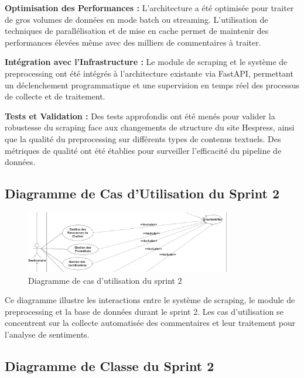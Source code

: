 \textbf{Optimisation des Performances :} L'architecture a été optimisée pour traiter de gros volumes de données en mode batch ou streaming. L'utilisation de techniques de parallélisation et de mise en cache permet de maintenir des performances élevées même avec des milliers de commentaires à traiter.

\textbf{Intégration avec l'Infrastructure :} Le module de scraping et le système de preprocessing ont été intégrés à l'architecture existante via FastAPI, permettant un déclenchement programmatique et une supervision en temps réel des processus de collecte et de traitement.

\textbf{Tests et Validation :} Des tests approfondis ont été menés pour valider la robustesse du scraping face aux changements de structure du site Hespress, ainsi que la qualité du preprocessing sur différents types de contenus textuels. Des métriques de qualité ont été établies pour surveiller l'efficacité du pipeline de données.

\subsection{Diagramme de Cas d'Utilisation du Sprint 2}

\begin{figure}[H]
\centering
\includegraphics[width=0.8\textwidth]{assets/images/sprint2-usecase.png}
\caption{Diagramme de cas d'utilisation du sprint 2}
\label{fig:sprint2-usecase}
\end{figure}

Ce diagramme illustre les interactions entre le système de scraping, le module de preprocessing et la base de données durant le sprint 2. Les cas d'utilisation se concentrent sur la collecte automatisée des commentaires et leur traitement pour l'analyse de sentiments.

\subsection{Diagramme de Classe du Sprint 2}

